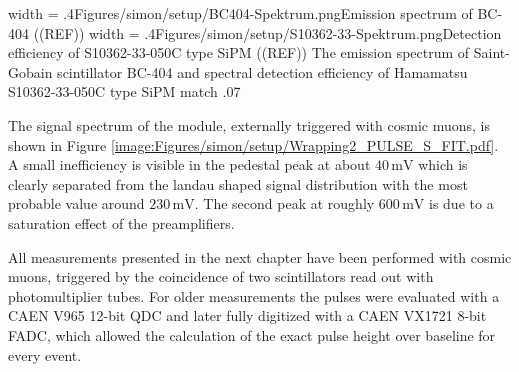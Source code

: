 \doubleimage
{width = .4\textwidth}{Figures/simon/setup/BC404-Spektrum.png}{Emission spectrum of BC-404 ((REF))}
{width = .4\textwidth}{Figures/simon/setup/S10362-33-Spektrum.png}{Detection efficiency of S10362-33-050C type SiPM ((REF))}
{The emission spectrum of Saint-Gobain scintillator BC-404 and spectral detection efficiency of Hamamatsu S10362-33-050C type SiPM match}
{.07\textwidth}

The signal spectrum of the module, externally triggered with cosmic muons, is shown in Figure \ref{image:Figures/simon/setup/Wrapping2_PULSE_S_FIT.pdf}. A small inefficiency is visible in the pedestal peak at about $40\,\text{mV}$ which is clearly separated from the landau shaped signal distribution with the most probable value around $230\,\text{mV}$. The second peak at roughly $600\,\text{mV}$ is due to a saturation effect of the preamplifiers.

All measurements presented in the next chapter have been performed with cosmic muons, triggered by the coincidence of two scintillators read out with photomultiplier tubes. For older measurements the pulses were evaluated with a CAEN V965 12-bit QDC and later fully digitized with a CAEN VX1721 8-bit FADC, which allowed the calculation of the exact pulse height over baseline for every event.